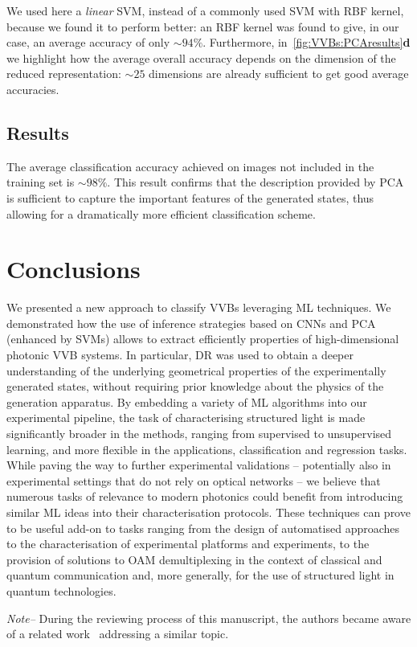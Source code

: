We used here a \emph{linear} SVM, instead of a commonly used SVM with RBF kernel, because we found it to perform better: an RBF kernel was found to give, in our case, an average accuracy of only $\sim94\%$.
Furthermore, in~\cref{fig:VVBs:PCAresults}\textbf{d} we highlight how the average overall accuracy depends on the dimension of the reduced representation: $\sim 25$ dimensions are already sufficient to get good average accuracies.

\subsection{Results}

The average classification accuracy achieved on images not included in the training set is $\sim 98 \%$. This result confirms that the description provided by \ac{PCA} is sufficient to capture the important features of the generated states, thus allowing for a dramatically more efficient classification scheme.


\section{Conclusions}
\label{sec:VVBs:conclusions}

We presented a new approach to classify \acp{VVB} leveraging ML techniques. We demonstrated how the use of inference strategies based on CNNs and PCA (enhanced by SVMs) allows to extract efficiently properties of high-dimensional photonic \ac{VVB} systems.
In particular, DR was used to obtain a deeper understanding of the underlying geometrical properties of the experimentally generated states, without requiring prior knowledge about the physics of the generation apparatus.
By embedding a variety of {\ac{ML}} algorithms into our experimental pipeline, the task of characterising structured light is made significantly broader in the methods, ranging from supervised to unsupervised learning, and more flexible in the applications, classification and regression tasks.
%
% 
While paving the way to further experimental validations -- potentially also in experimental settings that do not rely on optical networks -- we believe that numerous tasks of relevance to modern photonics could benefit from introducing similar {\ac{ML}} ideas into their characterisation protocols. These techniques can prove to be useful add-on to tasks ranging from the design of automatised approaches to the characterisation of experimental platforms and experiments, to the provision of solutions to OAM demultiplexing in the context of classical and quantum communication and, more generally, for the use of structured light in quantum technologies.

\textit{Note--} During the reviewing process of this manuscript, the authors
became aware of a related work~\cite{liu2019superhighresolution} addressing a similar topic.
